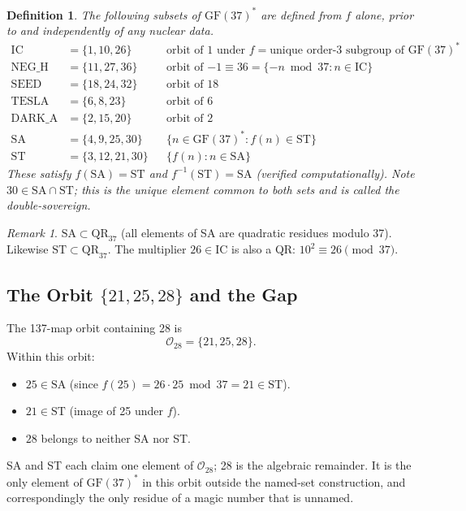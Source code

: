 \documentclass[11pt]{article}
\newtheorem{definition}{Definition}
\theoremstyle{remark}
\newtheorem{remark}{Remark}
\begin{document}
\begin{definition}
The following subsets of $\mathrm{GF}(37)^*$ are defined from $f$ alone, prior to
and independently of any nuclear data.
\begin{align*}
  \mathrm{IC}    &= \{1,10,26\}   && \text{orbit of }1\text{ under }f
                                    = \text{unique order-3 subgroup of }\mathrm{GF}(37)^*\\
  \mathrm{NEG\_H}&= \{11,27,36\}  && \text{orbit of }{-1}\equiv 36
                                    = \{-n\bmod 37: n\in\mathrm{IC}\}\\
  \mathrm{SEED}  &= \{18,24,32\}  && \text{orbit of }18\\
  \mathrm{TESLA} &= \{6,8,23\}    && \text{orbit of }6\\
  \mathrm{DARK\_A}&= \{2,15,20\}  && \text{orbit of }2\\
  \mathrm{SA}    &= \{4,9,25,30\} && \{n\in\mathrm{GF}(37)^*: f(n)\in\mathrm{ST}\}\\
  \mathrm{ST}    &= \{3,12,21,30\}&& \{f(n): n\in\mathrm{SA}\}
\end{align*}
These satisfy $f(\mathrm{SA})=\mathrm{ST}$ and $f^{-1}(\mathrm{ST})=\mathrm{SA}$
(verified computationally). Note $30\in\mathrm{SA}\cap\mathrm{ST}$; this is the
unique element common to both sets and is called the \emph{double-sovereign}.
\end{definition}

\begin{remark}
  $\mathrm{SA}\subset\mathrm{QR}_{37}$ (all elements of SA are quadratic residues
  modulo 37). Likewise $\mathrm{ST}\subset\mathrm{QR}_{37}$. The multiplier
  $26\in\mathrm{IC}$ is also a QR: $10^2\equiv 26\pmod{37}$.
\end{remark}

\subsection{The Orbit \texorpdfstring{$\{21,25,28\}$}{21,25,28} and the Gap}

The 137-map orbit containing 28 is
\[
  \mathcal{O}_{28} = \{21,25,28\}.
\]
Within this orbit:
\begin{itemize}
  \item $25\in\mathrm{SA}$ (since $f(25)=26\cdot 25\bmod 37 = 21\in\mathrm{ST}$).
  \item $21\in\mathrm{ST}$ (image of 25 under $f$).
  \item $28$ belongs to neither SA nor ST.
\end{itemize}
SA and ST each claim one element of $\mathcal{O}_{28}$; 28 is the algebraic remainder.
It is the only element of $\mathrm{GF}(37)^*$ in this orbit outside the named-set
construction, and correspondingly the only residue of a magic number that is unnamed.
\end{document}
